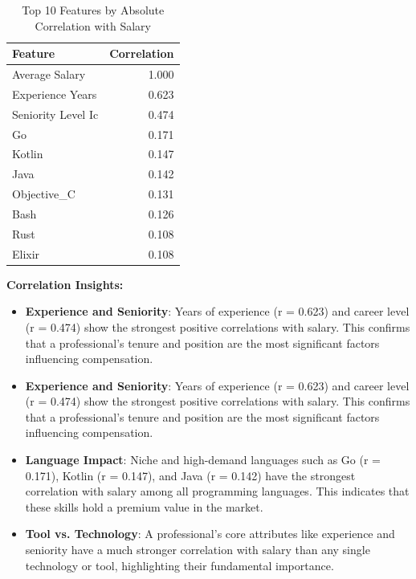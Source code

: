 \documentclass[12pt,a4paper]{article}
\begin{document}
\begin{table}[H]
	\centering
	\small
	\begin{tabular}{lr}
		\toprule
		\textbf{Feature}   & \textbf{Correlation} \\
		\midrule
		Average Salary     & 1.000                \\
		Experience Years   & 0.623                \\
		Seniority Level Ic & 0.474                \\
		Go                 & 0.171                \\
		Kotlin             & 0.147                \\
		Java               & 0.142                \\
		Objective\_C       & 0.131                \\
		Bash               & 0.126                \\
		Rust               & 0.108                \\
		Elixir             & 0.108                \\
		\bottomrule
	\end{tabular}
	\caption{Top 10 Features by Absolute Correlation with Salary}
\end{table}

\textbf{Correlation Insights:}
\begin{itemize}
	\item \textbf{Experience and Seniority}: Years of experience (r = 0.623) and career level (r = 0.474) show the strongest positive correlations with salary. This confirms that a professional's tenure and position are the most significant factors influencing compensation.
	\item \textbf{Experience and Seniority}: Years of experience (r = 0.623) and career level (r = 0.474) show the strongest positive correlations with salary. This confirms that a professional's tenure and position are the most significant factors influencing compensation.
	\item \textbf{Language Impact}: Niche and high-demand languages such as Go (r = 0.171), Kotlin (r = 0.147), and Java (r = 0.142) have the strongest correlation with salary among all programming languages. This indicates that these skills hold a premium value in the market.
	\item \textbf{Tool vs. Technology}: A professional's core attributes like experience and seniority have a much stronger correlation with salary than any single technology or tool, highlighting their fundamental importance.
\end{itemize}
\end{document}
